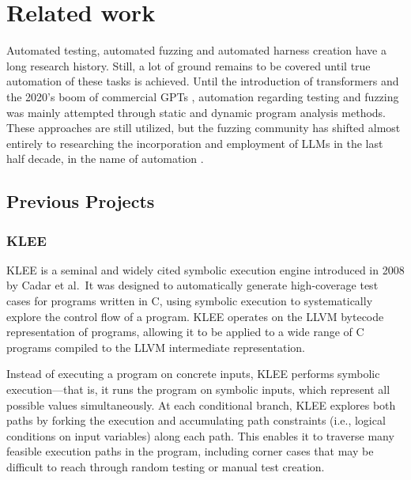 \documentclass[
  a4paper,
]{scrreprt}
\theoremstyle{definition}
\theoremstyle{remark}
\begin{document}

\chapter{Related work}\label{sec-related}

Automated testing, automated fuzzing and automated harness creation have
a long research history. Still, a lot of ground remains to be covered
until true automation of these tasks is achieved. Until the introduction
of transformers \autocite{vaswani2023} and the 2020's boom of commercial
GPTs \autocite{chatgpt}, automation regarding testing and fuzzing was
mainly attempted through static and dynamic program analysis methods.
These approaches are still utilized, but the fuzzing community has
shifted almost entirely to researching the incorporation and employment
of LLMs in the last half decade, in the name of automation
\autocite{iris,sun2024,prophetfuzz,oss-fuzz-gen,green2022,utopia,fuzzgpt,titanfuzz,fuzzgen,fudge}.

\section{Previous Projects}\label{previous-projects}

\subsection{KLEE}\label{klee}

KLEE \autocite{klee} is a seminal and widely cited symbolic execution
engine introduced in 2008 by Cadar et al.~It was designed to
automatically generate high-coverage test cases for programs written in
C, using symbolic execution to systematically explore the control flow
of a program. KLEE operates on the LLVM \autocite{llvm} bytecode
representation of programs, allowing it to be applied to a wide range of
C programs compiled to the LLVM intermediate representation.

Instead of executing a program on concrete inputs, KLEE performs
symbolic execution---that is, it runs the program on symbolic inputs,
which represent all possible values simultaneously. At each conditional
branch, KLEE explores both paths by forking the execution and
accumulating path constraints (i.e., logical conditions on input
variables) along each path. This enables it to traverse many feasible
execution paths in the program, including corner cases that may be
difficult to reach through random testing or manual test creation.
\end{document}
